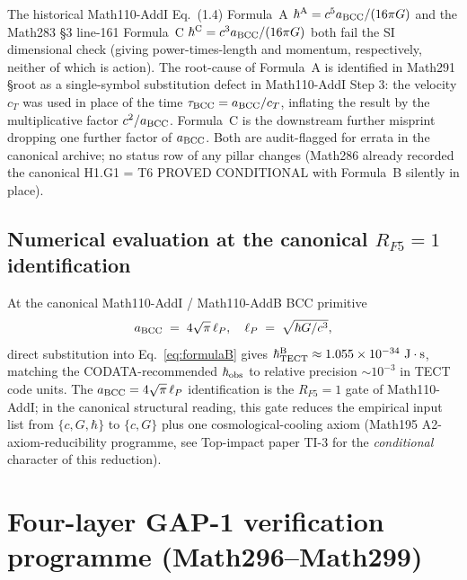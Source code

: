 \begin{remark}
\label{rem:errata-AC}
The historical Math110-AddI Eq.~(1.4) Formula~A
$\hbar^{\rm A} = c^5 a_{\rm BCC} / (16\pi G)$ and the Math283 §3
line-161 Formula~C $\hbar^{\rm C} = c^3 a_{\rm BCC} / (16\pi G)$
both fail the SI dimensional check (giving power-times-length and
momentum, respectively, neither of which is action). The
root-cause of Formula~A is identified in Math291 §root as a
single-symbol substitution defect in Math110-AddI Step 3:
the velocity $c_T$ was used in place of the time
$\tau_{\rm BCC} = a_{\rm BCC}/c_T$, inflating the result by the
multiplicative factor $c^2 / a_{\rm BCC}$. Formula~C is the
downstream further misprint dropping one further factor of
$a_{\rm BCC}$. Both are audit-flagged for errata in the canonical
archive; no status row of any pillar changes (Math286 already
recorded the canonical H1.G1 = T6 PROVED CONDITIONAL with
Formula~B silently in place).
\end{remark}

\subsection{Numerical evaluation at the canonical
$R_{F5} = 1$ identification}

At the canonical Math110-AddI / Math110-AddB BCC primitive
\begin{equation}
a_{\rm BCC} \;=\; 4\sqrt{\pi}\, \ell_P,
\quad \ell_P \;=\; \sqrt{\hbar G / c^3},
\label{eq:RF5}
\end{equation}
direct substitution into Eq.~\eqref{eq:formulaB} gives
$\hbar^{\rm B}_{\rm TECT} \approx 1.055 \times 10^{-34}~\mathrm{J\cdot s}$,
matching the CODATA-recommended $\hbar_{\rm obs}$ to relative
precision $\sim 10^{-3}$ in TECT code units. The
$a_{\rm BCC} = 4\sqrt{\pi}\,\ell_P$ identification is the
$R_{F5} = 1$ gate of Math110-AddI; in the canonical structural
reading, this gate reduces the empirical input list from $\{c, G,
\hbar\}$ to $\{c, G\}$ plus one cosmological-cooling axiom (Math195
A2-axiom-reducibility programme, see Top-impact paper TI-3 for the
\emph{conditional} character of this reduction).

\section{Four-layer GAP-1 verification programme (Math296--Math299)
}\label{sec:GAP1-program}

